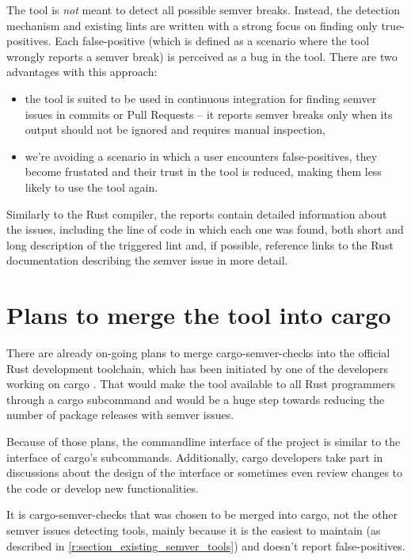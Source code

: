 \documentclass[licencjacka,en]{pracamgr}
\begin{document}
The tool is \textit{not} meant to detect all possible semver breaks.
Instead, the detection mechanism and existing lints are written
with a strong focus on finding only true-positives.
Each false-positive (which is defined as a scenario where the tool
wrongly reports a semver break) is perceived as a bug in the tool.
There are two advantages with this approach:
\begin{itemize}
	\item the tool is suited to be used in continuous integration
		for finding semver issues in commits or Pull Requests
		-- it reports semver breaks only when
		its output should not be ignored and requires manual inspection,
	\item we're avoiding a scenario in which
		a user encounters false-positives, they become frustated
		and their trust in the tool is reduced, making them
		less likely to use the tool again.
\end{itemize}

Similarly to the Rust compiler, the reports contain
detailed information about the issues, including
the line of code in which each one was found, both short and long description
of the triggered lint and, if possible, reference links to the Rust documentation
describing the semver issue in more detail.

\section{Plans to merge the tool into cargo}

There are already on-going plans to merge cargo-semver-checks into
the official Rust development toolchain,
which has been initiated by one of the developers working on cargo \cite{issue_merge_cargo}.
That would make the tool available to all Rust programmers
through a cargo subcommand and would be a huge step towards reducing the number of
package releases with semver issues.

Because of those plans, the commandline interface of the project is similar
to the interface of cargo's subcommands. Additionally, cargo developers
take part in discussions about the design of the interface \cite{issue_cli_interface}
or sometimes even review changes to the code or develop new functionalities.

It is cargo-semver-checks that was chosen to be merged into cargo,
not the other semver issues detecting tools,
mainly because it is the easiest to maintain
(as described in \ref{r:section_existing_semver_tools})
and doesn't report false-positives.
\end{document}
